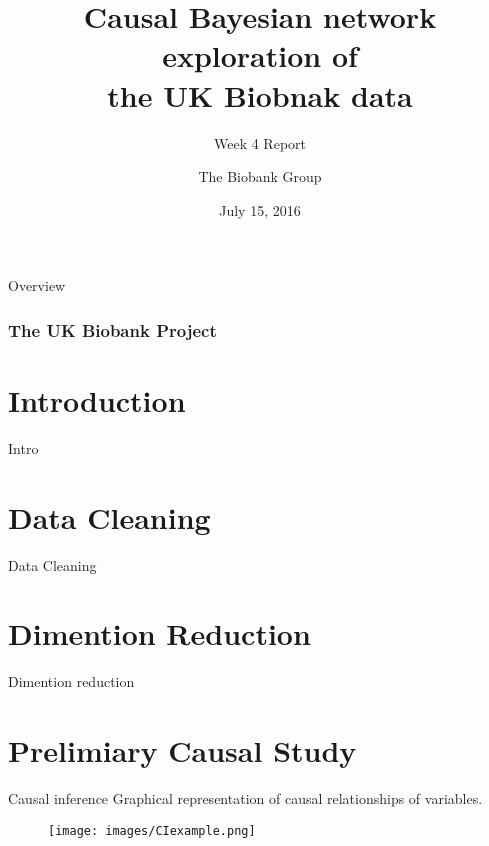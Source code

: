 \documentclass[10pt]{beamer} %
\title{Causal Bayesian network exploration of \\ the UK Biobnak data}
\subtitle{Week 4 Report}
\author[The Biobank Group]{The Biobank Group}
\institute[ATI]{The Alan Turing Institute}
\date{July 15, 2016}
\begin{document}
\begin{frame}[plain]
  \titlepage
\end{frame}
\begin{frame}[plain]{Overview}
 \frametitle{The UK Biobank Project}
    \tableofcontents
\end{frame}
\section{Introduction}
\begin{frame}[plain]{Intro}

\end{frame}

\section{Data Cleaning}
\begin{frame}[plain]{Data Cleaning}

\end{frame}


\section{Dimention Reduction}
\begin{frame}[plain]{Dimention reduction}

\end{frame}

\section{Prelimiary Causal Study}

\begin{frame}[plain]{Causal inference}
Graphical representation of causal relationships of variables.
\begin{figure}
\texttt{[image: images/CIexample.png]}
\end{figure}
\end{frame}
\end{document}
